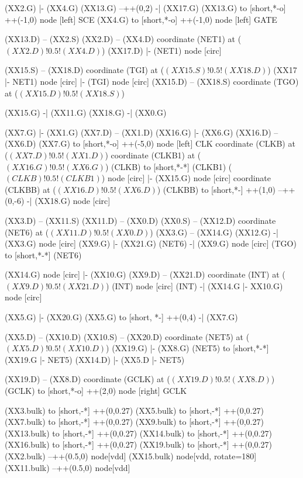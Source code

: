 \begin{circuitikz}[american]

	(XX2.G) |- (XX4.G)
	(XX13.G) --++(0,2) -| (XX17.G) 
	(XX13.G) to [short,*-o] ++(-1,0) node [left] {SCE}
	(XX4.G) to [short,*-o] ++(-1,0) node [left] {GATE}
	
	(XX13.D) -- (XX2.S)
	(XX2.D) -- (XX4.D)
	coordinate (NET1) at ($(XX2.D)!0.5!(XX4.D)$) 
 	(XX17.D) |- (NET1) node [circ] {}
	
	(XX15.S) -- (XX18.D)
	coordinate (TGI) at ($(XX15.S)!0.5!(XX18.D)$)
	(XX17 |- NET1) node [circ] {} |- (TGI) node [circ] {}
	(XX15.D) -- (XX18.S)
	coordinate (TGO) at ($(XX15.D)!0.5!(XX18.S)$)
	
	(XX15.G) -| (XX11.G)
	(XX18.G) -| (XX0.G)	
	
	(XX7.G) |- (XX1.G)
	(XX7.D) -- (XX1.D)
	(XX16.G) |- (XX6.G)
	(XX16.D) -- (XX6.D)
	(XX7.G) to [short,*-o] ++(-5,0) node [left] {CLK}
	coordinate (CLKB) at ($(XX7.D)!0.5!(XX1.D)$)
	coordinate (CLKB1) at ($(XX16.G)!0.5!(XX6.G)$)
	(CLKB) to [short,*-*] (CLKB1)%
	($(CLKB)!0.5!(CLKB1)$) node [circ] {} |- (XX15.G) node [circ] {}
	coordinate (CLKBB) at ($(XX16.D)!0.5!(XX6.D)$)
	(CLKBB) to [short,*-] ++(1,0) --++(0,-6) -| (XX18.G) node [circ] {}
	
	
	(XX3.D) -- (XX11.S)
	(XX11.D) -- (XX0.D)
	(XX0.S) -- (XX12.D)
	coordinate (NET6) at ($(XX11.D)!0.5!(XX0.D)$)
	(XX3.G) -- (XX14.G)
	(XX12.G) -| (XX3.G) node [circ] {}
	(XX9.G) |- (XX21.G)
	(NET6) -| (XX9.G) node [circ] {}
	(TGO) to [short,*-*] (NET6)
	
	(XX14.G) node [circ] {} |- (XX10.G) 
	(XX9.D) -- (XX21.D)
	coordinate (INT) at ($(XX9.D)!0.5!(XX21.D)$)
	(INT) node [circ] {}
	(INT) -| (XX14.G |- XX10.G) node [circ] {}
	
	(XX5.G) |- (XX20.G)
	(XX5.G) to [short, *-] ++(0,4) -| (XX7.G)
	
	(XX5.D) -- (XX10.D)
	(XX10.S) -- (XX20.D)
	coordinate (NET5) at ($(XX5.D)!0.5!(XX10.D)$)
	(XX19.G) |- (XX8.G)
	(NET5) to [short,*-*] (XX19.G |- NET5)
	(XX14.D) |- (XX5.D |- NET5)
	
	
	(XX19.D) -- (XX8.D)
	coordinate (GCLK) at ($(XX19.D)!0.5!(XX8.D)$)
	(GCLK) to [short,*-o] ++(2,0) node [right] {GCLK}
	
	
	(XX3.bulk) to [short,-*] ++(0,0.27)
	(XX5.bulk) to [short,-*] ++(0,0.27)
	(XX7.bulk) to [short,-*] ++(0,0.27)
	(XX9.bulk) to [short,-*] ++(0,0.27)
	(XX13.bulk) to [short,-*] ++(0,0.27)
	(XX14.bulk) to [short,-*] ++(0,0.27)
	(XX16.bulk) to [short,-*] ++(0,0.27)	
	(XX19.bulk) to [short,-*] ++(0,0.27)
	(XX2.bulk) --++(0.5,0) node[vdd] {}
	(XX15.bulk) node[vdd, rotate=180] {}
	(XX11.bulk) --++(0.5,0) node[vdd] {}
	

\end{circuitikz}
